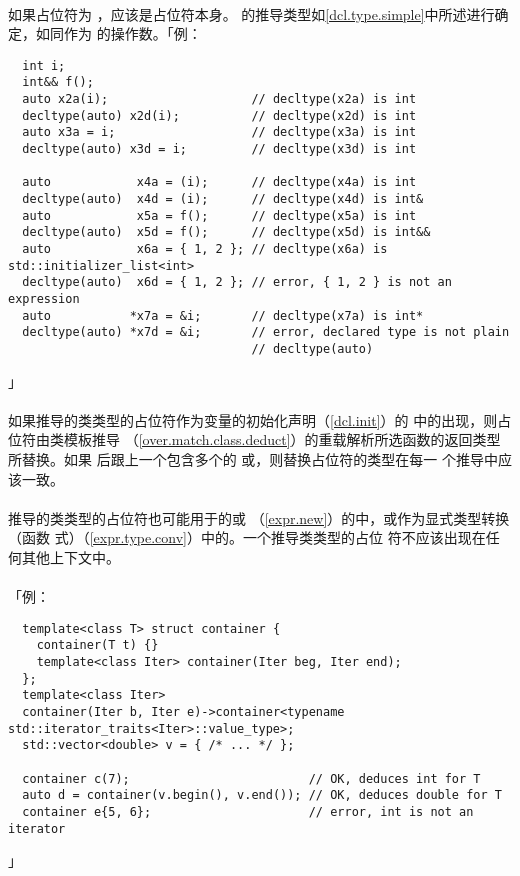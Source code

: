 \paragraph{}
如果占位符为 ，应该是占位符本身。
的推导类型如\ref{dcl.type.simple}中所述进行确定，如同作为
的操作数。「例：
\begin{lstlisting}
  int i;
  int&& f();
  auto x2a(i);                    // decltype(x2a) is int
  decltype(auto) x2d(i);          // decltype(x2d) is int
  auto x3a = i;                   // decltype(x3a) is int
  decltype(auto) x3d = i;         // decltype(x3d) is int

  auto            x4a = (i);      // decltype(x4a) is int
  decltype(auto)  x4d = (i);      // decltype(x4d) is int&
  auto            x5a = f();      // decltype(x5a) is int
  decltype(auto)  x5d = f();      // decltype(x5d) is int&&
  auto            x6a = { 1, 2 }; // decltype(x6a) is std::initializer_list<int>
  decltype(auto)  x6d = { 1, 2 }; // error, { 1, 2 } is not an expression
  auto           *x7a = &i;       // decltype(x7a) is int*
  decltype(auto) *x7d = &i;       // error, declared type is not plain
                                  // decltype(auto)
\end{lstlisting}」

\paragraph{}
如果推导的类类型的占位符作为变量的初始化声明（\ref{dcl.init}）的
中的出现，则占位符由类模板推导
（\ref{over.match.class.deduct}）的重载解析所选函数的返回类型所替换。如果
后跟上一个包含多个的
或，则替换占位符的类型在每一
个推导中应该一致。

\paragraph{}
推导的类类型的占位符也可能用于的或
（\ref{expr.new}）的中，或作为显式类型转换（函数
式）（\ref{expr.type.conv}）中的。一个推导类类型的占位
符不应该出现在任何其他上下文中。

\paragraph{}
「例：
\begin{lstlisting}
  template<class T> struct container {
    container(T t) {}
    template<class Iter> container(Iter beg, Iter end);
  };
  template<class Iter>
  container(Iter b, Iter e)->container<typename std::iterator_traits<Iter>::value_type>;
  std::vector<double> v = { /* ... */ };

  container c(7);                         // OK, deduces int for T
  auto d = container(v.begin(), v.end()); // OK, deduces double for T
  container e{5, 6};                      // error, int is not an iterator
\end{lstlisting}」


